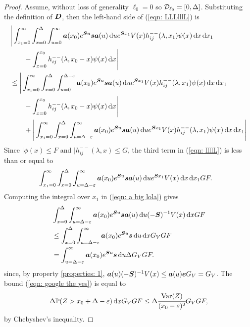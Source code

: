 \begin{proof}
	Assume, without loss of generality \(\ell_0=0\) so \(\mathcal{D}_{\ell_0}=[0,\Delta]\). Substituting the definition of \(\boldsymbol D\), then the left-hand side of (\ref{eqn: LLLlllL}) is
	\begin{align}
		&\Bigg|\int_{x_1=0}^\infty \int_{x=0}^{\Delta}\int_{u=0}^\infty \boldsymbol a (x_0)e^{\boldsymbol Su}\boldsymbol s \boldsymbol a(u) \, \mathrm{d} u e^{\boldsymbol S x_1} V(x) h_{ij}^{--}(\lambda, x_1) \psi(x) \, \mathrm{d} x \, \mathrm{d} x_1\nonumber
		\\&{}\qquad {} - \int_{x=0}^{x_0} h_{ij}^{--}(\lambda, x_0 - x)\psi(x)\, \mathrm{d} x\Bigg| \nonumber
		\\&\leq \Bigg|\int_{x_1=0}^\infty \int_{x=0}^{\Delta}\int_{u=0}^{\Delta-\varepsilon} \boldsymbol a (x_0)e^{\boldsymbol Su}\boldsymbol s \boldsymbol a(u) \, \mathrm{d} u e^{\boldsymbol S x_1} V(x) h_{ij}^{--}(\lambda, x_1) \psi(x) \, \mathrm{d} x \, \mathrm{d} x_1\nonumber
		\\&{}\qquad {} - \int_{x=0}^{x_0} h_{ij}^{--}(\lambda, x_0 - x)\psi(x)\, \mathrm{d} x\Bigg| \nonumber
		\\&\qquad {}+\Bigg|\int_{x_1=0}^\infty \int_{x=0}^{\Delta}\int_{u= \Delta-\varepsilon}^\infty  \boldsymbol a (x_0)e^{\boldsymbol Su}\boldsymbol s \boldsymbol a(u) \, \mathrm{d} u e^{\boldsymbol S x_1} V(x) h_{ij}^{--}(\lambda, x_1) \psi(x) \, \mathrm{d} x \, \mathrm{d} x_1\Bigg| \label{eqn: llllL}
	\end{align}
	Since \(|\phi(x)\leq F\) and \(|h_{ij}^{--}(\lambda,x)\leq G\), the third term in (\ref{eqn: llllL}) is less than or equal to 
	\begin{align}
		&\int_{x_1=0}^\infty \int_{x=0}^{\Delta}\int_{u= \Delta-\varepsilon}^\infty  \boldsymbol a (x_0)e^{\boldsymbol Su}\boldsymbol s \boldsymbol a(u) \, \mathrm{d} u e^{\boldsymbol S x_1} V(x) \, \mathrm{d} x \, \mathrm{d} x_1G F.\label{eqn: a big lola}
	\end{align} 
	Computing the integral over \(x_1\) in (\ref{eqn: a big lola}) gives
	\begin{align}
		& \int_{x=0}^{\Delta}\int_{u= \Delta-\varepsilon}^\infty  \boldsymbol a (x_0)e^{\boldsymbol Su}\boldsymbol s \boldsymbol a(u) \, \mathrm{d} u (-\boldsymbol S)^{-1}V(x) \, \mathrm{d} x G F\nonumber
		\\&\leq  \int_{x=0}^{\Delta}\int_{u= \Delta-\varepsilon}^\infty  \boldsymbol a (x_0)e^{\boldsymbol Su}\boldsymbol s \, \mathrm{d} u \, \mathrm{d} x G_V G F \nonumber
		\\&= \int_{u= \Delta-\varepsilon}^\infty  \boldsymbol a (x_0)e^{\boldsymbol Su}\boldsymbol s  \, \mathrm{d} u\Delta G_V G F.\label{eqn: google the yes}
	\end{align}
	since, by property \ref{properties: 1}, \(\boldsymbol a(u)(-\boldsymbol S)^{-1}V(x)\leq \boldsymbol a (u)\boldsymbol e G_V=G_V\). The bound (\ref{eqn: google the yes}) is equal to 
	\begin{align}
		\Delta \mathbb P(Z>x_0 + \Delta-\varepsilon) \, \mathrm{d} x G_V G F
		\leq  \Delta \cfrac{\mathrm{Var}(Z)}{(x_0-\varepsilon)^2} G_V G F, \label{eqn: JjJ}
	\end{align}
	by Chebyshev's inequality. 
	

\end{proof}
